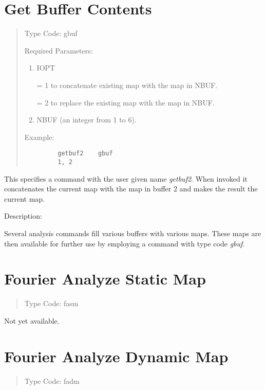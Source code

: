 \section{Get Buffer Contents} 
\begin{quotation}
\noindent     Type Code:  gbuf
\vspace{5mm}

\noindent Required Parameters:
\begin{enumerate}
      \item  IOPT

             = 1 to concatenate existing map with the map in NBUF.

             = 2 to replace the existing map with the map in NBUF.

      \item  NBUF (an integer from 1 to 6).
\end{enumerate}

\vspace{5mm}
\noindent     Example:
\begin{verbatim}
         getbuf2    gbuf
         1, 2
\end{verbatim}
\end{quotation}
This specifies a command with the user given name {\em getbuf2}.  When invoked it concatenates the current map with the map in buffer 2 and makes the result the current map.

\vspace{5mm}
     Description:
\vspace{2mm}

     Several analysis commands fill various buffers with various maps.  These maps are then available for further use by employing a command with type code {\em gbuf}.

\newpage
\section{Fourier Analyze Static Map}
\begin{quotation}
\noindent Type Code:  fasm
\end{quotation}

Not yet available.

\newpage
\section{Fourier Analyze Dynamic Map} 
\begin{quotation}
\noindent Type Code:  fadm
\end{quotation}

